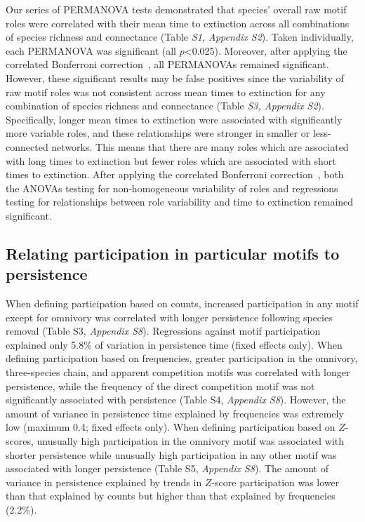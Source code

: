 \documentclass[12pt]{article}
\begin{document}
\begin{spacing}{2.0}
		Our series of PERMANOVA tests demonstrated that species' overall raw motif roles were correlated with their mean time to extinction across all combinations of species richness and connectance (Table \emph{S1, Appendix S2}). Taken individually, each PERMANOVA was significant (all $p$\textless0.025). Moreover, after applying the correlated Bonferroni correction~\citep{Drezner2016}, all PERMANOVAs remained significant.
		However, these significant results may be false positives since the variability of raw motif roles was not consistent across mean times to extinction for any combination of species richness and connectance (Table \emph{S3, Appendix S2}). 
		Specifically, longer mean times to extinction were associated with significantly more variable roles, and these relationships were stronger in smaller or less-connected networks. 
		This means that there are many roles which are associated with long times to extinction but fewer roles which are associated with short times to extinction.
		After applying the correlated Bonferroni correction~\citep{Drezner2016}, both the ANOVAs testing for non-homogeneous variability of roles and regressions testing for relationships between role variability and time to extinction remained significant.
    

    \subsection*{Relating participation in particular motifs to persistence}
    
        When defining participation based on counts, increased participation in any motif except for omnivory was correlated with longer persistence following species removal (Table S3, \emph{Appendix S8}).
        Regressions against motif participation explained only 5.8\% of variation in persistence time (fixed effects only).
        When defining participation based on frequencies, greater participation in the omnivory, three-species chain, and apparent competition motifs was correlated with longer persistence, while the frequency of the direct competition motif was not significantly associated with persistence (Table S4, \emph{Appendix S8}).
        However, the amount of variance in persistence time explained by frequencies was extremely low (maximum 0.4; fixed effects only). 
        When defining participation based on $Z$-scores, unusually high participation in the omnivory motif was associated with shorter persistence while unusually high participation in any other motif was associated with longer persistence (Table S5, \emph{Appendix S8}).
        The amount of variance in persistence explained by trends in $Z$-score participation was lower than that explained by counts but higher than that explained by frequencies (2.2\%).
        


\end{spacing}
\end{document}

